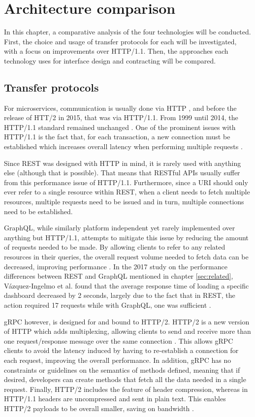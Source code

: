 \chapter{Architecture comparison}\label{sec:comparison}
In this chapter, a comparative analysis of the four technologies will be conducted. First, the choice and usage of transfer protocols for each will be investigated, with a focus on improvements over HTTP/1.1. Then, the approaches each technology uses for interface design and contracting will be compared.

\section{Transfer protocols}\label{sec:transfer}
For microservices, communication is usually done via HTTP \cite{zimmermann2016microservices}, and before the release of HTT/2 in 2015, that was via HTTP/1.1. From 1999 until 2014, the HTTP/1.1 standard remained unchanged \cite{rfc2616}. One of the prominent issues with HTTP/1.1 is the fact that, for each transaction, a new connection must be established which increases overall latency when performing multiple requests \cite{spero1994analysis}. 

Since REST was designed with HTTP in mind, it is rarely used with anything else (although that is possible). That means that RESTful APIs usually suffer from this performance issue of HTTP/1.1. Furthermore, since a URI should only ever refer to a single resource within REST\cite{masse2011rest}, when a client needs to fetch multiple resources, multiple requests need to be issued and in turn, multiple connections need to be established.

GraphQL, while similarly platform independent yet rarely implemented over anything but HTTP/1.1, attempts to mitigate this issue by reducing the amount of requests needed to be made. By allowing clients to refer to any related resources in their queries, the overall request volume needed to fetch data can be decreased, improving performance \cite{schrock2015blog}. In the 2017 study on the performance differences between REST and GraphQL mentioned in chapter \ref{sec:related}, Vázquez-Ingelmo et al. found that the average response time of loading a specific dashboard decreased by 2 seconds, largely due to the fact that in REST, the action required 17 requests while with GraphQL, one was sufficient \cite{vazquez2017improving}.

gRPC however, is designed for and bound to HTTP/2. HTTP/2 is a new version of HTTP which adds multiplexing, allowing clients to send and receive more than one request/response message over the same connection \cite{rfc7540}. This allows gRPC clients to avoid the latency induced by having to re-establish a connection for each request, improving the overall performance. In addition, gRPC has no constraints or guidelines on the semantics of methods defined, meaning that if desired, developers can create methods that fetch all the data needed in a single request. Finally, HTTP/2 includes the feature of header compression, whereas in HTTP/1.1 headers are uncompressed and sent in plain text. This enables HTTP/2 payloads to be overall smaller, saving on bandwidth \cite{rfc7540}.

